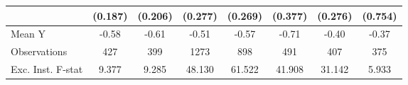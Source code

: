 {\begin{tabular}{l*{7}{c}}
            &     (0.187)         &     (0.206)         &     (0.277)         &     (0.269)         &     (0.377)         &     (0.276)         &     (0.754)         \\
\midrule
Mean Y      &       -0.58         &       -0.61         &       -0.51         &       -0.57         &       -0.71         &       -0.40         &       -0.37         \\
Observations&         427         &         399         &        1273         &         898         &         491         &         407         &         375         \\
Exc. Inst. F-stat&       9.377         &       9.285         &      48.130         &      61.522         &      41.908         &      31.142         &       5.933         \\
\bottomrule
\end{tabular}
}
